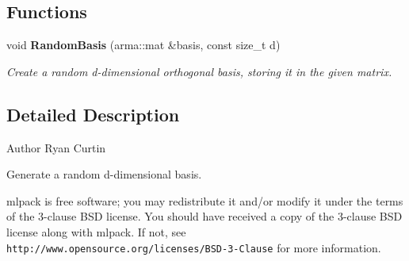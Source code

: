 \subsection*{Functions}
\begin{DoxyCompactItemize}
\item 
void \textbf{ Random\+Basis} (arma\+::mat \&basis, const size\+\_\+t d)
\begin{DoxyCompactList}\small\item\em Create a random d-\/dimensional orthogonal basis, storing it in the given matrix. \end{DoxyCompactList}\end{DoxyCompactItemize}


\subsection{Detailed Description}
\begin{DoxyAuthor}{Author}
Ryan Curtin
\end{DoxyAuthor}
Generate a random d-\/dimensional basis.

mlpack is free software; you may redistribute it and/or modify it under the terms of the 3-\/clause B\+SD license. You should have received a copy of the 3-\/clause B\+SD license along with mlpack. If not, see {\tt http\+://www.\+opensource.\+org/licenses/\+B\+S\+D-\/3-\/\+Clause} for more information. 